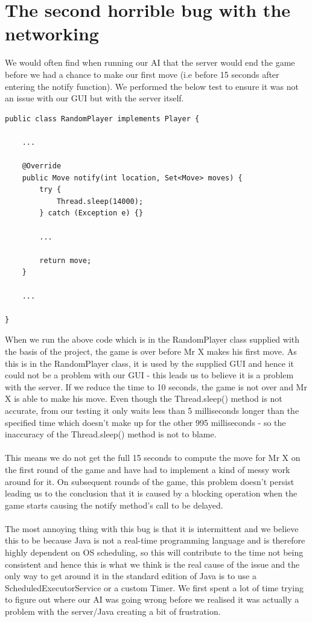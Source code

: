 \documentclass[a4paper, 12pt]{article}
\begin{document}
\section{The second horrible bug with the networking}
We would often find when running our AI that the server would end the game before we had a chance to make our first move (i.e before 15 seconds after entering the notify function). We performed the below test to ensure it was not an issue with our GUI but with the server itself.
\\
\begin{lstlisting}
public class RandomPlayer implements Player {

	...
	
	@Override
	public Move notify(int location, Set<Move> moves) {
		try {
			Thread.sleep(14000);
		} catch (Exception e) {}
		
		...
		
		return move;
	}
	
	...
	
}
\end{lstlisting}
\hfill \break
When we run the above code which is in the RandomPlayer class supplied with the basis of the project, the game is over before Mr X makes his first move. As this is in the RandomPlayer class, it is used by the supplied GUI and hence it could not be a problem with our GUI - this leads us to believe it is a problem with the server. If we reduce the time to 10 seconds, the game is not over and Mr X is able to make his move. Even though the Thread.sleep() method is not accurate, from our testing it only waits less than 5 milliseconds longer than the specified time which doesn't make up for the other 995 milliseconds - so the inaccuracy of the Thread.sleep() method is not to blame.
\\
\\
This means we do not get the full 15 seconds to compute the move for Mr X on the first round of the game and have had to implement a kind of messy work around for it. On subsequent rounds of the game, this problem doesn't persist leading us to the conclusion that it is caused by a blocking operation when the game starts causing the notify method's call to be delayed.
\\
\\
The most annoying thing with this bug is that it is intermittent and we believe this to be because Java is not a real-time programming language and is therefore highly dependent on OS scheduling, so this will contribute to the time not being consistent and hence this is what we think is the real cause of the issue and the only way to get around it in the standard edition of Java is to use a ScheduledExecutorService or a custom Timer.
We first spent a lot of time trying to figure out where our AI was going wrong before we realised it was actually a problem with the server/Java creating a bit of frustration.
\end{document}
